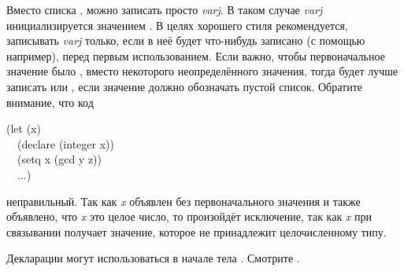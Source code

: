 \begin{defspec}
Вместо списка , можно записать просто
\emph{varj}. В таком случае \emph{varj} инициализируется значением {\false}.
В целях хорошего стиля рекомендуется, записывать \emph{varj} только, если в неё
будет что-нибудь записано (с помощью  например), перед первым
использованием. 
Если важно, чтобы первоначальное значение было {\false}, вместо некоторого
неопределённого значения,
тогда будет лучше записать  или , если значение должно обозначать пустой список. Обратите
внимание, что код
\begin{lisp}
(let (x) \\
~~(declare (integer x)) \\
~~(setq x (gcd y z)) \\
~~...)
\end{lisp}
неправильный. Так как \emph{x} объявлен без первоначального значения и также
объявлено, что \emph{x} это целое число, то произойдёт исключение, так как
\emph{x} при связывании получает {\nil} значение, которое не принадлежит
целочисленному типу.

Декларации могут использоваться в начале тела . Смотрите .
\end{defspec}

